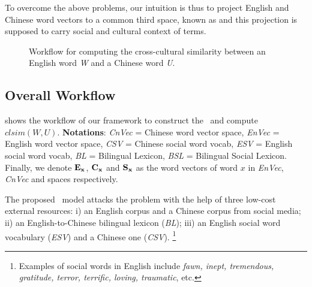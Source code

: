 To overcome the above problems, our intuition is thus 
to project English and Chinese word vectors to a common third space, 
known as \textit{\socvec} and this projection is supposed to carry 
social and cultural context of terms.
%
\begin{wrapfigure}{R}{0.5\textwidth}   
	\caption{Workflow for computing the cross-cultural similarity between 
an English word \textit{W} and a Chinese word \textit{U}.}
\vspace{-10pt}
	\label{fig:overview}
\end{wrapfigure} 

\subsection{Overall Workflow}
 shows the workflow of our framework to construct the \textit{\socvec}~and compute $clsim(W,U)$. 
{\textbf{Notations}: \textit{CnVec} = Chinese word vector space, \textit{EnVec} = English word vector space,
	\textit{CSV} = Chinese social word vocab, \textit{ESV} = English social word vocab,
	\textit{BL} = Bilingual Lexicon, \textit{BSL} = Bilingual Social Lexicon. Finally, we denote $\bf{E_x}$, $\bf{C_x}$ and $\bf{S_x}$ as the word vectors of 
	word $x$ in \textit{EnVec}, \textit{CnVec} and \textit{\socvec} spaces
	respectively.}

The proposed \textit{\socvec}~model attacks the problem with the help of three low-cost external resources: 
i) an English corpus and a Chinese corpus from social media; ii) an English-to-Chinese bilingual lexicon (\textit{BL});  
iii) an English social word vocabulary (\textit{ESV}) and a Chinese one
(\textit{CSV}).
\footnote{Examples of social words in English include
\textit{fawn, inept, tremendous, gratitude,
terror, terrific, loving, traumatic}, etc.}


